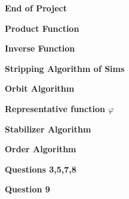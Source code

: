 \documentclass[12pt]{extarticle}
\begin{document}
\vspace{40mm}

\begin{center}
\textbf{End of Project}
\end{center}

\pagebreak
\begin{center}
\textbf{Product Function}
\end{center}


\begin{center}
\textbf{Inverse Function}
\end{center}


\begin{center}
\textbf{Stripping Algorithm of Sims}
\end{center}


\begin{center}
\textbf{Orbit Algorithm}
\end{center}


\begin{center}
\textbf{Representative function $\varphi$}
\end{center}


\begin{center}
\textbf{Stabilizer Algorithm}
\end{center}


\begin{center}
\textbf{Order Algorithm}
\end{center}


\begin{center}
\textbf{Questions 3,5,7,8}
\end{center}


\begin{center}
\textbf{Question 9}
\end{center}

\end{document}
